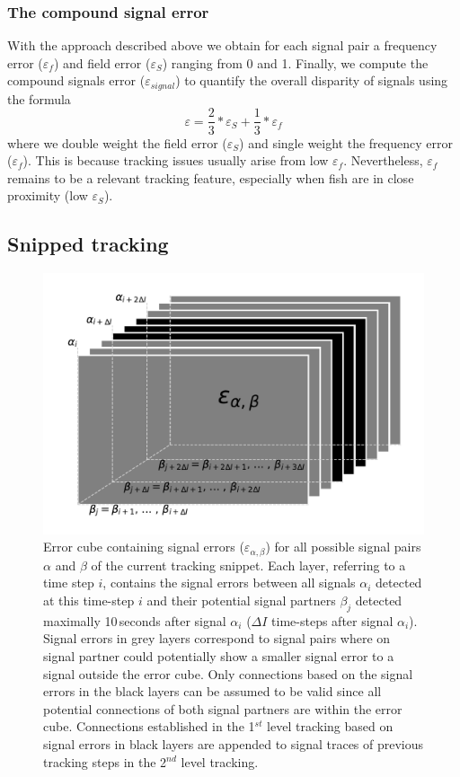 \documentclass[11pt,pdftex]{article}
\begin{document}
\subsubsection{The compound signal error}

With the approach described above we obtain for each signal pair a frequency error ($\varepsilon_{f}$) and field error ($\varepsilon_{S}$) ranging from 0 and 1. Finally, we compute the compound signals error ($\varepsilon_{signal}$) to quantify the overall disparity of signals using the formula
\begin{equation}\label{sig.error} 
  \varepsilon = \frac{2}{3} * \varepsilon_{S} + \frac{1}{3} * \varepsilon_{f}
\end{equation}
where we double weight the field error ($\varepsilon_{S}$) and single weight the frequency error ($\varepsilon_{f}$). This is because tracking issues usually arise from low $\varepsilon_{f}$. Nevertheless, $\varepsilon_{f}$ remains to be a relevant tracking feature, especially when fish are in close proximity (low $\varepsilon_{S}$).

\subsection{Snipped tracking}

\begin{figure}[t]
  \centerline{\includegraphics[width=.9\linewidth]{cube_error}}
  \caption{\label{error_cube} Error cube containing signal errors ($\varepsilon_{\alpha, \beta}$) for all possible signal pairs $\alpha$ and $\beta$ of the current tracking snippet. Each layer, referring to a time step $i$, contains the signal errors between all signals $\alpha_i$ detected at this time-step $i$ and their potential signal partners $\beta_j$ detected maximally 10\,seconds after signal $\alpha_i$ ($\Delta I$ time-steps after signal $\alpha_i$). Signal errors in grey layers correspond to signal pairs where on signal partner could potentially show a smaller signal error to a signal outside the error cube. Only connections based on the signal errors in the black layers can be assumed to be valid since all potential connections of both signal partners are within the error cube. Connections established in the 1$^{st}$ level tracking based on signal errors in black layers are appended to signal traces of previous tracking steps in the 2$^{nd}$ level tracking.}
\end{figure}
\end{document}
